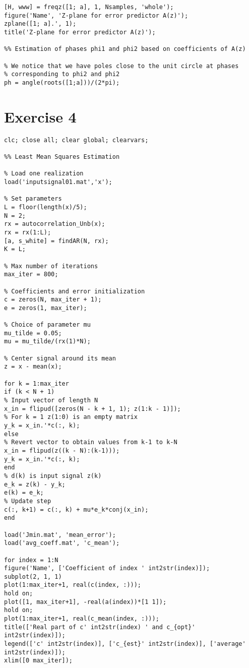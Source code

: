 \documentclass[a4paper,10pt]{article}
\begin{document}
\begin{verbatim}
[H, www] = freqz([1; a], 1, Nsamples, 'whole');
figure('Name', 'Z-plane for error predictor A(z)');
zplane([1; a].', 1);
title('Z-plane for error predictor A(z)');

%% Estimation of phases phi1 and phi2 based on coefficients of A(z)

% We notice that we have poles close to the unit circle at phases
% corresponding to phi2 and phi2
ph = angle(roots([1;a]))/(2*pi);
\end{verbatim}

\section{Exercise 4}

\begin{verbatim}
clc; close all; clear global; clearvars;

%% Least Mean Squares Estimation

% Load one realization
load('inputsignal01.mat','x');

% Set parameters
L = floor(length(x)/5);
N = 2;
rx = autocorrelation_Unb(x);
rx = rx(1:L);
[a, s_white] = findAR(N, rx);
K = L;

% Max number of iterations
max_iter = 800;

% Coefficients and error initialization
c = zeros(N, max_iter + 1);
e = zeros(1, max_iter);

% Choice of parameter mu
mu_tilde = 0.05;
mu = mu_tilde/(rx(1)*N);

% Center signal around its mean
z = x - mean(x);

for k = 1:max_iter
if (k < N + 1)
% Input vector of length N
x_in = flipud([zeros(N - k + 1, 1); z(1:k - 1)]);
% For k = 1 z(1:0) is an empty matrix
y_k = x_in.'*c(:, k);
else
% Revert vector to obtain values from k-1 to k-N
x_in = flipud(z((k - N):(k-1)));
y_k = x_in.'*c(:, k);
end
% d(k) is input signal z(k)
e_k = z(k) - y_k;
e(k) = e_k;
% Update step
c(:, k+1) = c(:, k) + mu*e_k*conj(x_in);
end

load('Jmin.mat', 'mean_error');
load('avg_coeff.mat', 'c_mean');

for index = 1:N
figure('Name', ['Coefficient of index ' int2str(index)]);
subplot(2, 1, 1)
plot(1:max_iter+1, real(c(index, :)));
hold on;
plot([1, max_iter+1], -real(a(index))*[1 1]);
hold on;
plot(1:max_iter+1, real(c_mean(index, :)));
title(['Real part of c' int2str(index) ' and c_{opt}' int2str(index)]);
legend(['c' int2str(index)], ['c_{est}' int2str(index)], ['average' int2str(index)]);
xlim([0 max_iter]);




\end{verbatim}
\end{document}

